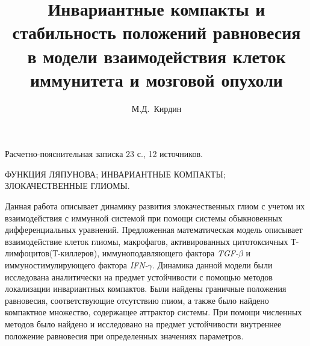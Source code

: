 \documentclass[12pt,a4paper]{extarticle}
\title{Инвариантные компакты и стабильность положений равновесия в модели взаимодействия клеток иммунитета и мозговой опухоли}
\author{М.Д.~Кирдин}
\theoremstyle{definition}
\theoremstyle{definition}
\theoremstyle{definition}
\begin{document}
	\begin{spacing}{1.0}
		\maketitle
	\end{spacing}
	
	\begin{annotation}
	
	Расчетно-пояснительная записка 23 с., 12  источников.
	
	\MakeUppercase{функция Ляпунова; инвариантные компакты; злокачественные глиомы.}
	
	Данная работа описывает динамику развития злокачественных глиом с учетом их взаимодействия с иммунной системой при помощи системы обыкновенных дифференциальных уравнений. Предложенная математическая модель описывает взаимодействие клеток глиомы, макрофагов, активированных цитотоксичных Т-лимфоцитов(Т-киллеров), иммуноподавляющего фактора \textit{TGF-}$\beta$ и иммуностимулирующего фактора \textit{IFN-}$\gamma$. Динамика данной модели были исследована аналитически на предмет устойчивости с помощью методов локализации инвариантных компактов. Были найдены граничные положения равновесия, соответствующие отсутствию глиом, а также было найдено компактное множество, содержащее аттрактор системы. При помощи численных методов было найдено и исследовано на предмет устойчивости внутреннее положение равновесия при определенных значениях параметров.
	
	\end{annotation}
	
	\tableofcontents
	
\end{document}
